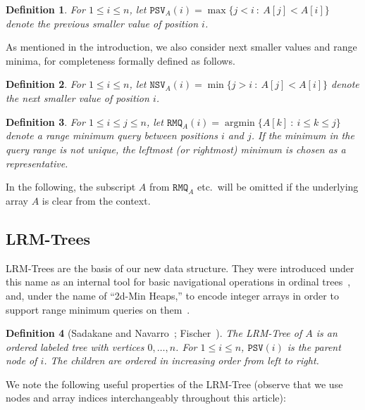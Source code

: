 \documentclass[11pt,onecolumn,final]{article} \usepackage{a4}
\newcommand{\psv}[0]{\mathtt{PSV}}
\newcommand{\nsv}[0]{\mathtt{NSV}}
\newcommand{\rmq}[0]{\mathtt{RMQ}}
\theoremstyle{plain}
\newtheorem{definition}{Definition}
\theoremstyle{remark}
\DeclareMathOperator*{\argmin}{argmin}
\begin{document}
\begin{definition}
  \label{def:psv}
  For $1\le i \le n$, let $\psv_A(i)=\max\bigl\{j < i~:~A[j] < A[i]\bigr\}$ denote the \emph{previous smaller value} of position $i$.
\end{definition}

As mentioned in the introduction, we also consider next smaller values and range minima, for completeness formally defined as follows.

\begin{definition}
  \label{def:nsv}
  For $1\le i \le n$, let $\nsv_A(i)=\min\bigl\{j > i~:~A[j] < A[i]\bigr\}$ denote the \emph{next smaller value} of position $i$.
\end{definition}

\begin{definition}
  \label{def:rmq}
  For $1\le i\le j \le n$, let $\rmq_A(i)=\argmin\bigl\{A[k]~:~i\le k\le j\bigr\}$ denote a \emph{range minimum query} between positions $i$ and $j$. If the minimum in the query range is not unique, the leftmost (or rightmost) minimum is chosen as a representative.
\end{definition}

In the following, the subscript $A$ from $\rmq_A$ etc.\ will be omitted if the underlying array $A$ is clear from the context.

\subsection{LRM-Trees }
\label{sect:lrm}

LRM-Trees are the basis of our new data structure. They were introduced under this name as an internal tool for basic navigational operations in ordinal trees~\cite{sadakane10fully}, and, under the name of ``2d-Min Heaps,'' to encode integer arrays in order to support range minimum queries on them~\cite{fischer10optimal}.
 
\begin{definition}[Sadakane and Navarro~\cite{sadakane10fully}; Fischer~\cite{fischer10optimal}]
  \label{def:2dmin}
  The \emph{LRM-Tree} of $A$ is an ordered labeled tree with vertices $0, \dots, n$. For $1 \le i \le n$, $\psv(i)$ is the parent node of $i$. The children are ordered in increasing order from left to right.
\end{definition}

We note the following useful properties of the LRM-Tree (observe that we use nodes and array indices interchangeably throughout this article):
\end{document}
